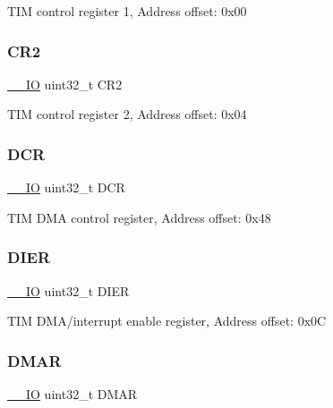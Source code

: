 T\+IM control register 1, Address offset\+: 0x00 \mbox{\label{struct_t_i_m___type_def_afdfa307571967afb1d97943e982b6586}} 
\subsubsection{\texorpdfstring{C\+R2}{CR2}}
{\footnotesize\ttfamily \mbox{\hyperlink{core__sc300_8h_aec43007d9998a0a0e01faede4133d6be}{\+\_\+\+\_\+\+IO}} uint32\+\_\+t C\+R2}

T\+IM control register 2, Address offset\+: 0x04 \mbox{\label{struct_t_i_m___type_def_af6225cb8f4938f98204d11afaffd41c9}} 
\subsubsection{\texorpdfstring{D\+CR}{DCR}}
{\footnotesize\ttfamily \mbox{\hyperlink{core__sc300_8h_aec43007d9998a0a0e01faede4133d6be}{\+\_\+\+\_\+\+IO}} uint32\+\_\+t D\+CR}

T\+IM D\+MA control register, Address offset\+: 0x48 \mbox{\label{struct_t_i_m___type_def_a07fccbd85b91e6dca03ce333c1457fcb}} 
\subsubsection{\texorpdfstring{D\+I\+ER}{DIER}}
{\footnotesize\ttfamily \mbox{\hyperlink{core__sc300_8h_aec43007d9998a0a0e01faede4133d6be}{\+\_\+\+\_\+\+IO}} uint32\+\_\+t D\+I\+ER}

T\+IM D\+M\+A/interrupt enable register, Address offset\+: 0x0C \mbox{\label{struct_t_i_m___type_def_ab9087f2f31dd5edf59de6a59ae4e67ae}} 
\subsubsection{\texorpdfstring{D\+M\+AR}{DMAR}}
{\footnotesize\ttfamily \mbox{\hyperlink{core__sc300_8h_aec43007d9998a0a0e01faede4133d6be}{\+\_\+\+\_\+\+IO}} uint32\+\_\+t D\+M\+AR}

